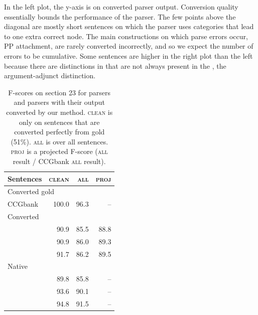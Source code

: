 In the left plot, the y-axis is \parseval on converted \candc parser output.
Conversion quality essentially bounds the performance of the parser.  The few
points above the diagonal are mostly short sentences on which the \candc parser
uses categories that lead to one extra correct node.
The main constructions on which parse errors occur, \myeg PP attachment, are
rarely converted incorrectly, and so we expect the number of errors to be
cumulative.  Some sentences are higher in the right plot than the left because
there are distinctions in \ccg that are not always present in the \ptb, \myeg the
argument-adjunct distinction.

\begin{table}
\renewcommand{\tabcolsep}{1.8mm}
\small
\begin{center}
\begin{tabular}{lrr|r}
	\hline
	Sentences & \textsc{clean} & \textsc{all} & \textsc{proj} \\
	\hline
	\hline
		\multicolumn{2}{l}{Converted gold \ccg} & & \\
		CCGbank & \hspace{0mm}100.0 & \hspace{0mm}96.3 & -- \\
	\hline
		\multicolumn{2}{l}{Converted \ccg} & & \\
		\textcite{Clark-Curran:2007} & 90.9 & 85.5 & 88.8 \\
		\textcite{Fowler-Penn:2010} & 90.9 & 86.0 & 89.3 \\
		\textcite{Auli-Lopez:2011} & 91.7 & 86.2 & 89.5 \\
	\hline
		\multicolumn{2}{l}{Native \ptb} & & \\
		\textcite{Klein-Manning:2003} & 89.8 & 85.8 & -- \\
		\textcite{Petrov-Klein:2007} & 93.6 & 90.1 & -- \\
		\textcite{Charniak-Johnson:2005} & 94.8 & 91.5 & -- \\
	\hline
\end{tabular}
\caption{
	\label{tab:full-comp}
	F-scores on section 23 for \ptb parsers and \ccg parsers with their output
	converted by our method.
	\textsc{clean} is only on sentences that are converted perfectly from gold
	\ccg (51\%).
	\textsc{all} is over all sentences.  
	\textsc{proj} is a projected F-score (\textsc{all} result / CCGbank
	\textsc{all} result).
}
\end{center}
\end{table}

